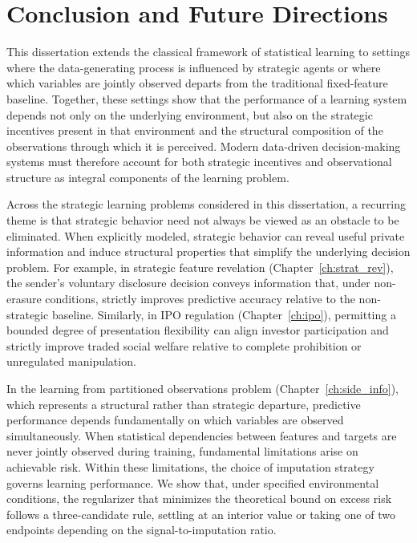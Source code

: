 \chapter{Conclusion and Future Directions}
\label{ch:conclusion}

This dissertation extends the classical framework of statistical learning to settings where the data-generating process is influenced by strategic agents or where which variables are jointly observed departs from the traditional fixed-feature baseline. Together, these settings show that the performance of a learning system depends not only on the underlying environment, but also on the strategic incentives present in that environment and the structural composition of the observations through which it is perceived. Modern data-driven decision-making systems must therefore account for both strategic incentives and observational structure as integral components of the learning problem.

Across the strategic learning problems considered in this dissertation, a recurring theme is that strategic behavior need not always be viewed as an obstacle to be eliminated. When explicitly modeled, strategic behavior can reveal useful private information and induce structural properties that simplify the underlying decision problem. For example, in strategic feature revelation (Chapter~\ref{ch:strat_rev}), the sender's voluntary disclosure decision conveys information that, under non-erasure conditions, strictly improves predictive accuracy relative to the non-strategic baseline. Similarly, in IPO regulation (Chapter~\ref{ch:ipo}), permitting a bounded degree of presentation flexibility can align investor participation and strictly improve traded social welfare relative to complete prohibition or unregulated manipulation.

In the learning from partitioned observations problem (Chapter~\ref{ch:side_info}), which represents a structural rather than strategic departure, predictive performance depends fundamentally on which variables are observed simultaneously. When statistical dependencies between features and targets are never jointly observed during training, fundamental limitations arise on achievable risk. Within these limitations, the choice of imputation strategy governs learning performance. We show that, under specified environmental conditions, the regularizer that minimizes the theoretical bound on excess risk follows a three-candidate rule, settling at an interior value or taking one of two endpoints depending on the signal-to-imputation ratio.

